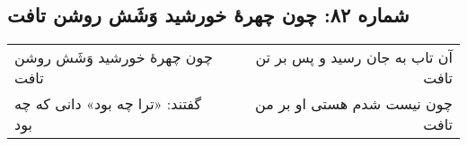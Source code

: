 \begin{center}
\section*{شماره ۸۲: چون چهرۀ خورشید وَشَش روشن تافت}
\label{sec:082}
\begin{longtable}{l p{0.5cm} r}
چون چهرهٔ خورشید وَشَش روشن تافت
&&
آن تاب به جان رسید و پس بر تن تافت
\\
گفتند: «ترا چه بود» دانی که چه بود
&&
چون نیست شدم هستی او بر من تافت
\\
\end{longtable}
\end{center}
